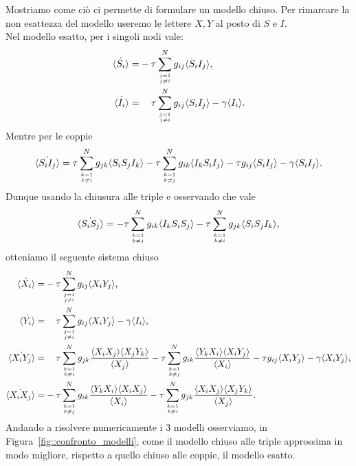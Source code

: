 Mostriamo come ci\`o ci permette di formulare un modello chiuso. Per rimarcare la non esattezza del modello useremo le lettere $X,Y$ al posto di $S$ e $I$. \\
Nel  modello esatto, per i singoli nodi vale: \begin{equation*}
\begin{aligned}
	\dot{\angol{S_i}} = &-\tau \sum_{j=1\atop {j\neq i }} ^N g_{ij} \angol{S_i I_j},\\
	\dot{\angol{I_i}} = &\spa\tau \sum_{j=1\atop {j\neq i }} ^N g_{ij} \angol{S_i I_j} -\gamma \angol{I_i}.
\end{aligned}
\end{equation*}
Mentre per le coppie 
$$
\dot{\langle S_i I_j \rangle} = \tau \sum_{k=1\atop{k\neq i }}^N g_{jk} \langle S_iS_jI_k \rangle - \tau \sum_{k=1\atop{k\neq j }}^N g_{ik} \langle I_kS_iI_j \rangle - \tau  g_{ij} \langle S_i I_j \rangle  -\gamma \langle S_i I_j \rangle.
$$
Dunque usando la chiusura alle triple e osservando che vale
$$ \dot{\langle S_i S_j \rangle} = -\tau \sum_{k=1\atop{k \neq j}}^N g_{ik} \langle I_kS_iS_j \rangle - \tau \sum_{k=1\atop{k\neq i }}^N g_{jk} \langle S_iS_jI_k \rangle,$$ 
otteniamo il seguente sistema chiuso 
\begin{equation}\label{Chiuso_triple}
\begin{aligned}
		\dot{\angol{X_i}} = &-\tau \sum_{j=1\atop {j\neq i }} ^N g_{ij} \angol{X_i Y_j},\\
	\dot{\angol{Y_i}} = &\spa\tau \sum_{j=1\atop {j\neq i }} ^N g_{ij} \angol{X_i Y_j} -\gamma \angol{I_i}, \\
\dot{\angol{X_i Y_j}} =& \spa \tau \sum_{k=1\atop{k\neq i }}^N g_{jk} \frac{\angol{X_iX_j}\angol{X_jY_k}}{\angol{X_j}} - \tau \sum_{k=1\atop{k\neq j }}^N g_{ik} \frac{\angol{Y_kX_i}\angol{X_iY_j}}{\angol{X_i}}- \tau  g_{ij} \angol{X_i Y_j}  -\gamma \angol{X_i Y_j},\\
\dot{\angol{X_i X_j}} = &-\tau \sum_{k=1\atop{k \neq j}}^N g_{ik} \frac{\angol{Y_kX_i}\angol{X_iX_j}}{\angol{X_i}} - \tau \sum_{k=1\atop{k\neq i }}^N g_{jk} \frac{\angol{X_iX_j}\angol{X_jY_k}}{\angol{X_j}}.
\end{aligned}
\end{equation} 
Andando a risolvere numericamente i $3$ modelli osserviamo, in Figura~\ref{fig::confronto_modelli}, come il modello chiuso alle triple approssima in modo migliore, rispetto a quello chiuso alle coppie, il modello esatto.
